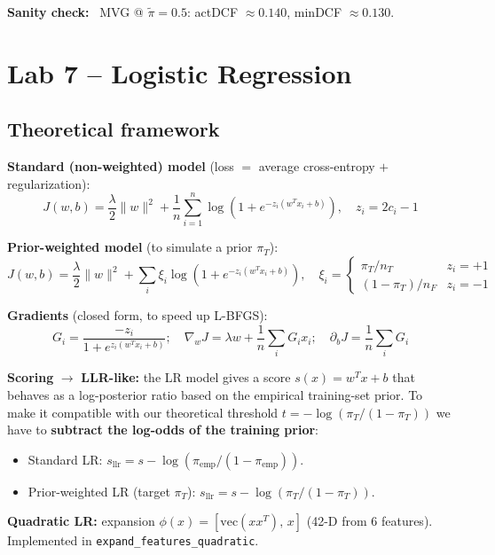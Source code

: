 \documentclass[11pt,a4paper]{article}
\begin{document}
\textbf{Sanity check:} \checkmark\ MVG @ $\tilde{\pi}=0.5$:
actDCF $\approx 0.140$, minDCF $\approx 0.130$.

\section{Lab 7 -- Logistic Regression}\label{sec:lab7}

\subsection{Theoretical framework}

\textbf{Standard (non-weighted) model} (loss $=$ average cross-entropy
$+$ regularization):
\[
J(w, b) = \frac{\lambda}{2}\|w\|^2
       + \frac{1}{n}\sum_{i=1}^{n} \log\!\left(1 + e^{-z_i(w^Tx_i + b)}\right),
\quad z_i = 2c_i - 1
\]

\textbf{Prior-weighted model} (to simulate a prior $\pi_T$):
\[
J(w, b) = \frac{\lambda}{2}\|w\|^2
       + \sum_i \xi_i \log\!\left(1 + e^{-z_i(w^Tx_i + b)}\right),\quad
\xi_i =
\begin{cases}
\pi_T / n_T       & z_i = +1 \\
(1-\pi_T) / n_F   & z_i = -1
\end{cases}
\]

\textbf{Gradients} (closed form, to speed up L-BFGS):
\[
G_i = \frac{-z_i}{1 + e^{z_i(w^Tx_i + b)}};\quad
\nabla_w J = \lambda w + \frac{1}{n}\sum_i G_i x_i;\quad
\partial_b J = \frac{1}{n}\sum_i G_i
\]

\textbf{Scoring} $\rightarrow$ \textbf{LLR-like:} the LR model gives a
score $s(x) = w^T x + b$ that behaves as a log-posterior ratio based
on the empirical training-set prior. To make it compatible with our
theoretical threshold $t = -\log(\pi_T/(1-\pi_T))$ we have to
\textbf{subtract the log-odds of the training prior}:
\begin{itemize}
\item Standard LR:
      $s_{\textrm{llr}} = s - \log(\pi_{\textrm{emp}} / (1-\pi_{\textrm{emp}}))$.
\item Prior-weighted LR (target $\pi_T$):
      $s_{\textrm{llr}} = s - \log(\pi_T / (1-\pi_T))$.
\end{itemize}

\textbf{Quadratic LR:} expansion
$\phi(x) = [\textrm{vec}(xx^T),\,x]$ (42-D from 6 features).
Implemented in \texttt{expand\_features\_quadratic}.
\end{document}
